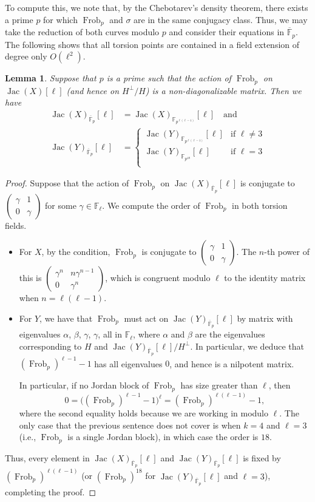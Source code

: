 \documentclass{amsproc}
\numberwithin{equation}{section}
\newtheorem{lemma}[equation]{Lemma}
\theoremstyle{definition}
\theoremstyle{remark}
\DeclareMathOperator{\Jac}{Jac}
\DeclareMathOperator{\Frob}{Frob}
\newcommand{\FF}{\mathbb F}
\newcommand{\ttwomatrix}[4]{\left(\begin{smallmatrix} #1 & #2 \\ #3 & #4\end{smallmatrix}\right)}
\begin{document}
To compute this, we note that, by the Chebotarev's density theorem, there exists a prime $p$ for which $\Frob_p$ and $\sigma$ are in the same conjugacy class.
Thus, we may take the reduction of both curves modulo $p$ and consider their equations in $\overline{\FF}_p$.
The following  shows that all torsion points are contained in a field extension of degree only $O(\ell^2)$.
\begin{lemma}
\label{lem:small_field}
Suppose that $p$ is a prime such that the action of $\Frob_p$ on $\Jac(X)[\ell]$ (and hence on $H^\perp/H$) is a non-diagonalizable matrix. Then we have
\begin{align}
\Jac(X)_{\overline{\FF}_p}[\ell] &= \Jac(X)_{\FF_{p^{\ell(\ell-1)}}}[\ell] \quad\text{and}\quad  \\
\Jac(Y)_{\overline{\FF}_p}[\ell] &= 
\begin{cases}
\Jac(Y)_{\FF_{p^{\ell(\ell-1)}}}[\ell] & \text{if }\ell\neq 3 \\
\Jac(Y)_{\FF_{p^{18}}}[\ell] & \text{if }\ell = 3 \\
\end{cases}
\end{align}
\end{lemma}
\begin{proof}
    Suppose that the action of $\Frob_p$ on $\Jac(X)_{\overline{\FF}_p}[\ell]$ is conjugate to $\ttwomatrix\gamma 1 0 \gamma$ for some $\gamma\in\FF_\ell$.
    We compute the order of $\Frob_p$ in both torsion fields.
    \begin{itemize}
    \item For $X$, by the condition, $\Frob_p$ is conjugate to $\ttwomatrix \gamma 1 0 \gamma$. The $n$-th power of this is $\ttwomatrix{\gamma^n}{n\gamma^{n-1}}{0}{\gamma^n}$, which is congruent modulo $\ell$ to the identity matrix when $n=\ell(\ell-1)$.
    \item For $Y$, we have that $\Frob_p$ must act on $\Jac(Y)_{\overline{\FF}_p}[\ell]$ by matrix with eigenvalues $\alpha$, $\beta$, $\gamma$, $\gamma$, all in $\FF_\ell$, where $\alpha$ and $\beta$
    are the eigenvalues corresponding to $H$ and $\Jac(Y)_{\overline{\FF}_p}[\ell]/H^\perp$.
    In particular, we deduce that $(\Frob_p)^{\ell-1} - 1$ has all eigenvalues $0$, and hence is a nilpotent matrix. 
    
    In particular, if no Jordan block of $\Frob_p$ has size greater than $\ell$, then
    \begin{equation}
        0 = \big((\Frob_p)^{\ell-1} - 1\big)^\ell = (\Frob_p)^{\ell(\ell-1)} - 1,
    \end{equation}
    where the second equality holds because we are working in modulo $\ell$. 
    The only case that the previous sentence does not cover is when $k=4$ and $\ell=3$ (i.e., $\Frob_p$ is a single Jordan block), in which case the order is $18$.
    \end{itemize}
    Thus, every element in $\Jac(X)_{\overline{\FF}_p}[\ell]$ and $\Jac(Y)_{\overline{\FF}_p}[\ell]$ is fixed by $(\Frob_p)^{\ell(\ell-1)}$ (or $(\Frob_p)^{18}$ for $\Jac(Y)_{\overline{\FF}_p}[\ell]$ and $\ell=3$), completing the proof.
\end{proof}
\end{document}
